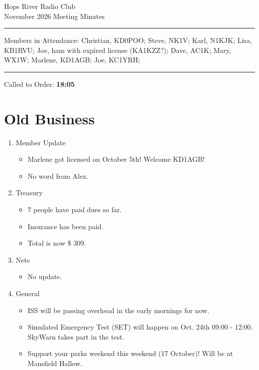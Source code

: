 \documentclass[12pt, letterpaper]{article}
\begin{document}
\begin{center}
	\huge{Hops River Radio Club}\\[10pt]
	\large{November 2026 Meeting Minutes}
\end{center}
\rule{\textwidth}{0.5pt}
	\noindent Members in Attendance: Christian, KD0POO;  Steve, NK1V; Karl, N1KJK; Lisa, KB1RVU; Joe, ham with expired license (KA1KZZ?); Dave, AC1K; Mary, WX1W;  Marlene, KD1AGB; Joe, KC1YRH;

\rule{\textwidth}{0.5pt}

Called to Order: \textbf{18:05}

\section{Old Business}
    \begin{enumerate}
        \item Member Update
            \begin{itemize}
                \item Marlene got licensed on October 5th! Welcome KD1AGB!
                \item No word from Alex.
            \end{itemize}
        \item Treasury
            \begin{itemize}
                \item 7 people have paid dues so far.
                \item Insurance has been paid.
                \item Total is now $\mathdollar$ 309.
            \end{itemize}
        \item Nets
            \begin{itemize}
                \item No update.
            \end{itemize}
        \item General
            \begin{itemize}
                \item ISS will be passing overhead in the early mornings for now.
                \item Simulated Emergency Test (SET) will happen on Oct. 24th 09:00 - 12:00. SkyWarn takes part in the test.
                \item Support your parks weekend this weekend (17 October)! Will be at Mansfield Hallow.

\end{itemize}
\end{enumerate}
\end{document}
